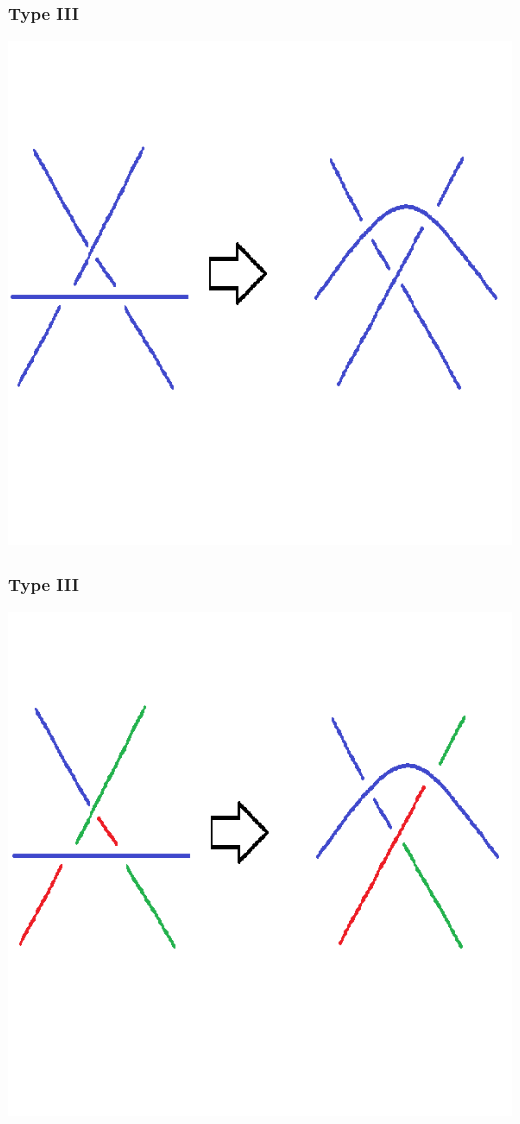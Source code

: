 \documentclass{beamer}
\begin{document}
\begin{frame}
  \frametitle{Type III}
  \begin{center}
    \includegraphics[scale=.6]{t3-c1}
  \end{center}
\end{frame}

\begin{frame}
  \frametitle{Type III}
  \begin{center}
    \includegraphics[scale=.6]{t3-c2}
  \end{center}
\end{frame}
\end{document}
